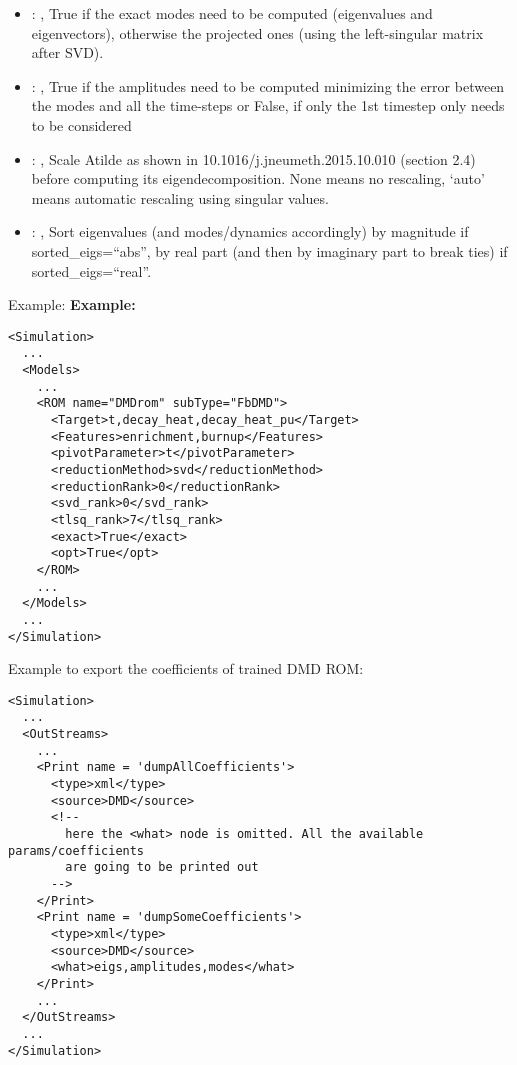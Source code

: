 \begin{itemize}
    \item {}: ,
      True if the exact modes need to be computed (eigenvalues and
      eigenvectors),   otherwise the projected ones (using the left-singular matrix after SVD).

    \item {}: ,
      True if the amplitudes need to be computed minimizing the error
      between the modes and all the time-steps or False, if only the 1st timestep only needs to be
      considered

    \item {}: ,
      Scale Atilde as shown in 10.1016/j.jneumeth.2015.10.010 (section 2.4) before computing its
      eigendecomposition. None means no rescaling, ‘auto’ means automatic rescaling using singular
      values.

    \item {}: ,
      Sort eigenvalues (and modes/dynamics accordingly) by magnitude if sorted\_eigs=``abs'',
      by real part (and then by imaginary part to break ties) if sorted\_eigs=``real''.
  \end{itemize}

\hspace{24pt}
Example:
\textbf{Example:}
\begin{lstlisting}[style=XML,morekeywords={name,subType}]
<Simulation>
  ...
  <Models>
    ...
    <ROM name="DMDrom" subType="FbDMD">
      <Target>t,decay_heat,decay_heat_pu</Target>
      <Features>enrichment,burnup</Features>
      <pivotParameter>t</pivotParameter>
      <reductionMethod>svd</reductionMethod>
      <reductionRank>0</reductionRank>
      <svd_rank>0</svd_rank>
      <tlsq_rank>7</tlsq_rank>
      <exact>True</exact>
      <opt>True</opt>
    </ROM>
    ...
  </Models>
  ...
</Simulation>
\end{lstlisting}

Example to export the coefficients of trained DMD ROM:
\begin{lstlisting}[style=XML,morekeywords={name,subType}]
<Simulation>
  ...
  <OutStreams>
    ...
    <Print name = 'dumpAllCoefficients'>
      <type>xml</type>
      <source>DMD</source>
      <!--
        here the <what> node is omitted. All the available params/coefficients
        are going to be printed out
      -->
    </Print>
    <Print name = 'dumpSomeCoefficients'>
      <type>xml</type>
      <source>DMD</source>
      <what>eigs,amplitudes,modes</what>
    </Print>
    ...
  </OutStreams>
  ...
</Simulation>
\end{lstlisting}


